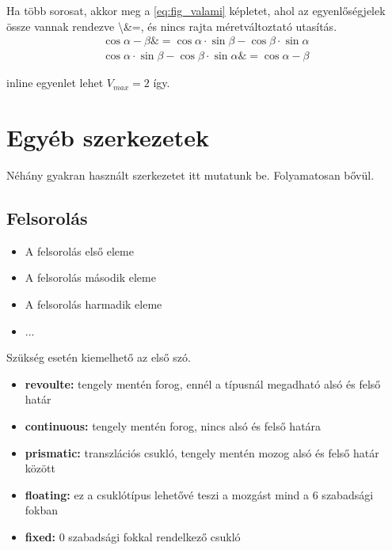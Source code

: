 \documentclass[12pt,a4paper]{article}
\begin{document}
    Ha több sorosat, akkor meg a \ref{eq:fig_valami} képletet, ahol az egyenlőségjelek össze vannak rendezve \textbackslash \&=, és nincs rajta méretváltoztató utasítás.
    \begin{equation}
        \begin{aligned}
        \cos{\alpha-\beta} \&= \cos{\alpha}\cdot\sin{\beta}-\cos{\beta}\cdot\sin{\alpha}\\
         \cos{\alpha}\cdot\sin{\beta}-\cos{\beta}\cdot\sin{\alpha} \&= \cos{\alpha-\beta}
        \end{aligned}
        \label{eq:fig_valami}
    \end{equation}	
    
    inline egyenlet lehet \(V_{max}=2 \) így. 

	\section{Egyéb szerkezetek}
	Néhány gyakran használt szerkezetet itt mutatunk be. Folyamatosan bővül.
	
	\subsection{Felsorolás}
		
		\begin{itemize}
			\item A felsorolás első eleme
			\item A felsorolás második eleme
			\item A felsorolás harmadik eleme
			\item ...
		\end{itemize}
	
		Szükség esetén kiemelhető az első szó.
		
		\begin{itemize}
			\item \textbf{revoulte:} tengely mentén forog, ennél a típusnál megadható alsó és felső határ
			\item \textbf{continuous:} tengely mentén forog, nincs alsó és felső határa
			\item \textbf{prismatic:} transzlációs csukló, tengely mentén mozog alsó és felső határ között
			\item \textbf{floating:} ez a csuklótípus lehetővé teszi a mozgást mind a 6 szabadsági fokban
			\item \textbf{fixed:} 0 szabadsági fokkal rendelkező csukló
		\end{itemize}
	
\end{document}
